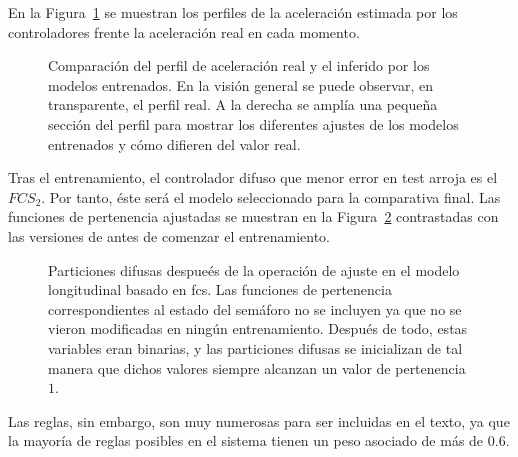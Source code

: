 En la Figura~\ref{fig:fcs-test-comparisons} se muestran los perfiles de la aceleración estimada por los controladores frente la aceleración real en cada momento. 

\begin{figure}
	\centering
	\qquad
	\caption[Comparación del perfil de aceleración real y el inferido por los modelos entrenados]{Comparación del perfil de aceleración real y el inferido por los modelos entrenados. En la visión general se puede observar, en transparente, el perfil real. A la derecha se amplía una pequeña sección del perfil para mostrar los diferentes ajustes de los modelos entrenados y cómo difieren del valor real.}
	\label{fig:fcs-test-comparisons}
\end{figure}

Tras el entrenamiento, el controlador difuso que menor error en test arroja es el $FCS_2$. Por tanto, éste será el modelo seleccionado para la comparativa final. Las funciones de pertenencia ajustadas se muestran en la Figura~\ref{fig:adjusted-fuzzy-partitions} contrastadas con las versiones de antes de comenzar el entrenamiento.

\begin{figure}[!b]
	\centering
	\qquad
	\qquad
	\qquad
	\caption[Particiones difusas después de la operación de ajuste en el modelo longitudinal basado en \ac{fcs}]{Particiones difusas despueés de la operación de ajuste en el modelo longitudinal basado en \ac{fcs}. Las funciones de pertenencia correspondientes al estado del semáforo no se incluyen ya que no se vieron modificadas en ningún entrenamiento. Después de todo, estas variables eran binarias, y las particiones difusas se inicializan de tal manera que dichos valores siempre alcanzan un valor de pertenencia $1$.}
	\label{fig:adjusted-fuzzy-partitions}
\end{figure}

Las reglas, sin embargo, son muy numerosas para ser incluidas en el texto, ya que la mayoría de reglas posibles en el sistema tienen un peso asociado de más de $0.6$.

